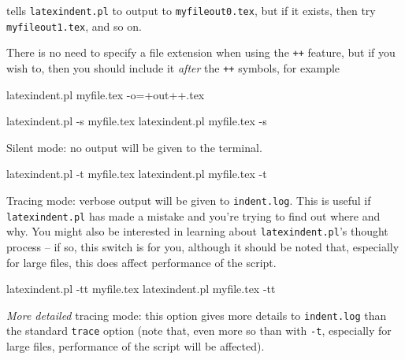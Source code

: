  tells \texttt{latexindent.pl} to output to \texttt{myfileout0.tex}, but if it exists,
 then try \texttt{myfileout1.tex}, and so on.

 There is no need to specify a file extension when using the \texttt{++} feature, but if
 you wish to, then you should include it \emph{after} the \texttt{++} symbols, for
 example

 \begin{commandshell}
latexindent.pl myfile.tex -o=+out++.tex
\end{commandshell}

 

 \begin{commandshell}
latexindent.pl -s myfile.tex
latexindent.pl myfile.tex -s
\end{commandshell}

 Silent mode: no output will be given to the terminal.


 \begin{commandshell}
latexindent.pl -t myfile.tex
latexindent.pl myfile.tex -t
\end{commandshell}

 \label{page:traceswitch}
 Tracing mode: verbose output will be given to \texttt{indent.log}. This is useful if
 \texttt{latexindent.pl} has made a mistake and you're trying to find out where and why.
 You might also be interested in learning about \texttt{latexindent.pl}'s thought process
 -- if so, this switch is for you, although it should be noted that, especially for large
 files, this does affect performance of the script.


 \begin{commandshell}
latexindent.pl -tt myfile.tex
latexindent.pl myfile.tex -tt
\end{commandshell}

 \emph{More detailed} tracing mode: this option gives more details to
 \texttt{indent.log}
 than the standard \texttt{trace} option (note that, even more so than with \texttt{-t},
 especially for large files, performance of the script will be affected).


